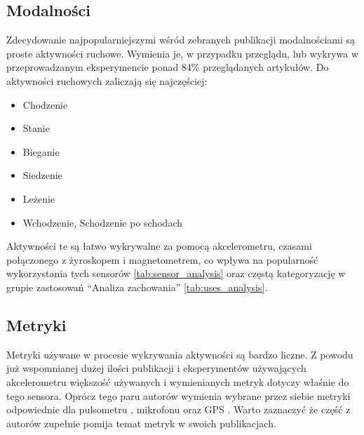 \subsection{Modalności}
Zdecydowanie najpopularniejszymi wśród zebranych publikacji modalnościami są proste aktywności ruchowe. Wymienia je, w przypadku przeglądu, lub wykrywa w przeprowadzanym eksperymencie ponad 84\% przeglądanych artykułów. Do aktywności ruchowych zaliczają się najczęściej:
\begin{itemize}
    \item Chodzenie
    \item Stanie
    \item Bieganie
    \item Siedzenie
    \item Leżenie
    \item Wchodzenie, Schodzenie po schodach
    \label{base_modalities}
\end{itemize}

Aktywności te są łatwo wykrywalne za pomocą akcelerometru, czasami połączonego z żyroskopem i magnetometrem, co wpływa na popularność wykorzystania tych sensorów \ref{tab:sensor_analysis} oraz częstą kategoryzację w grupie zastosowań ``Analiza zachowania'' \ref{tab:uses_analysis}. 


\subsection{Metryki}
Metryki używane w procesie wykrywania aktywności są bardzo liczne. Z powodu już wspomnianej dużej ilości publikacji i eksperymentów używających akcelerometru większość używanych i wymienianych metryk dotyczy właśnie do tego sensora. Oprócz tego paru autorów wymienia wybrane przez siebie metryki odpowiednie dla pulsometru \cite{S04}, mikrofonu \cite{S22, S46} oraz GPS \cite{S26}. Warto zaznaczyć że część z autorów zupełnie pomija temat metryk w swoich publikacjach.

